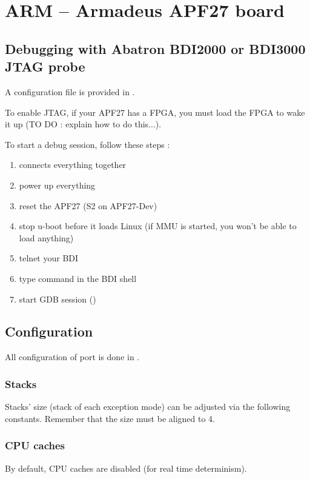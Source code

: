 \section{ARM -- Armadeus APF27 board}

\subsection{Debugging with Abatron BDI2000 or BDI3000 JTAG probe}

A configuration file is provided in .

To enable JTAG, if your APF27 has a FPGA, you must load the FPGA to wake it up (TO DO : explain how to do this...).

To start a debug session, follow these steps :
\begin{enumerate}
\item connects everything together
\item power up everything
\item reset the APF27 (S2 on APF27-Dev)
\item stop u-boot before it loads Linux (if MMU is started, you won't be able to load anything)
\item telnet your BDI
\item type  command in the BDI shell
\item start GDB session ()
\end{enumerate}

\subsection{Configuration}

All configuration of port is done in .

\subsubsection{Stacks}

Stacks' size (stack of each exception mode) can be adjusted via the following constants. Remember that the size must be aligned to 4.

\subsubsection{CPU caches}

By default, CPU caches are disabled (for real time determinism).

